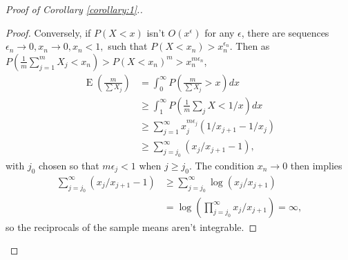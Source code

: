 \documentclass[12pt]{article}
\renewcommand{\P}{P}
\newcommand{\x}{X}
\DeclareMathOperator{\E}{E}
\begin{document}
\begin{proof}[Proof of Corollary \ref{corollary:1}.]
\begin{proof}
    Conversely, if $\P(\x<x)$ isn't $O(x^\epsilon)$ for any $\epsilon$, there are sequences $\epsilon_n \to 0, x_n\to 0, x_n<1,$ such that $\P(\x<x_n)>x_n^{\epsilon_n}$. Then as $\P(\frac{1}{m}\sum_{j=1}^m\x_j < x_n) > \P(\x<x_n)^m > x_n^{m\epsilon_n}$,
    \begin{align}
      \E\left(\frac{m}{\sum \x_j}\right) &= \int_0^\infty \P\left(\frac{m}{\sum\x_j}>x\right)dx\\
                              &\ge \int_1^\infty \P\left(\frac{1}{m}\sum_j\x < 1/x\right)dx\\
                              &\ge \sum_{j=1}^\infty x_j^{m\epsilon_j}(1/x_{j+1}-1/x_j)\\
                              &\ge \sum_{j=j_0}^\infty (x_j/x_{j+1}-1),
    \end{align}
    with $j_0$ chosen so that $m\epsilon_j<1$ when $j\ge j_0$. The condition $x_n\to 0$ then implies
    \begin{align}
      \sum_{j=j_0}^\infty (x_j/x_{j+1}-1) &\ge \sum_{j=j_0}^\infty \log(x_j/x_{j+1})\\
                                        &=\log\left(\prod_{j=j_0}^\infty x_j/x_{j+1}\right)=\infty,
    \end{align}
    so the reciprocals of the sample means aren't integrable. %
  \end{proof}

    \end{proof}
\end{document}
